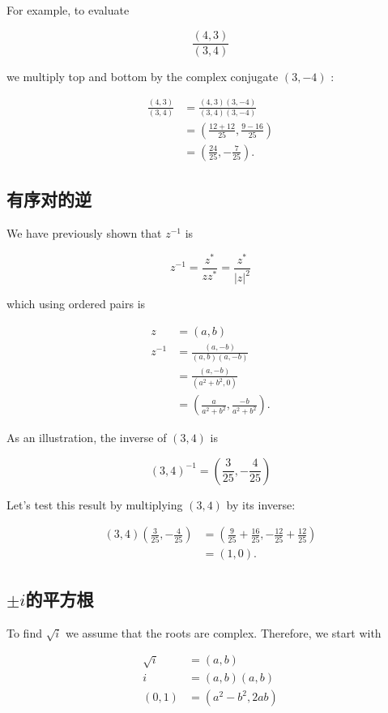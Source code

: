 For example, to evaluate

$$
\frac{(4,3)}{(3,4)}
$$

we multiply top and bottom by the complex conjugate $(3,-4)$ :

$$
\begin{aligned}
\frac{(4,3)}{(3,4)} & =\frac{(4,3)(3,-4)}{(3,4)(3,-4)} \\
& =\left(\frac{12+12}{25}, \frac{9-16}{25}\right) \\
& =\left(\frac{24}{25},-\frac{7}{25}\right) .
\end{aligned}
$$

\subsection{有序对的逆}
We have previously shown that $z^{-1}$ is

$$
z^{-1}=\frac{z^{*}}{z z^{*}}=\frac{z^{*}}{|z|^{2}}
$$

which using ordered pairs is

$$
\begin{aligned}
z & =(a, b) \\
z^{-1} & =\frac{(a,-b)}{(a, b)(a,-b)} \\
& =\frac{(a,-b)}{\left(a^{2}+b^{2}, 0\right)} \\
& =\left(\frac{a}{a^{2}+b^{2}}, \frac{-b}{a^{2}+b^{2}}\right) .
\end{aligned}
$$

As an illustration, the inverse of $(3,4)$ is

$$
(3,4)^{-1}=\left(\frac{3}{25},-\frac{4}{25}\right)
$$

Let's test this result by multiplying $(3,4)$ by its inverse:

$$
\begin{aligned}
(3,4)\left(\frac{3}{25},-\frac{4}{25}\right) & =\left(\frac{9}{25}+\frac{16}{25},-\frac{12}{25}+\frac{12}{25}\right) \\
& =(1,0) .
\end{aligned}
$$

\subsection{\boldmath $\pm i$的平方根}
To find $\sqrt{i}$ we assume that the roots are complex. Therefore, we start with

$$
\begin{aligned}
\sqrt{i} & =(a, b) \\
i & =(a, b)(a, b) \\
(0,1) & =\left(a^{2}-b^{2}, 2 a b\right)
\end{aligned}
$$

